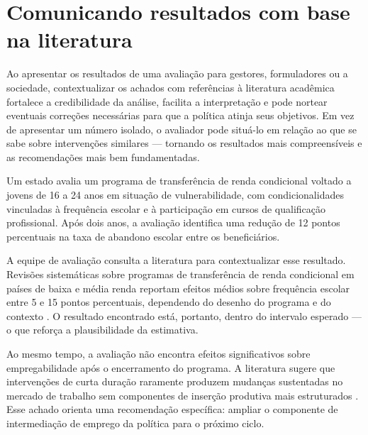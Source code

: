 \documentclass[12pt, a4paper, openany]{book}
\begin{document}
\section{Comunicando resultados com base na literatura}

Ao apresentar os resultados de uma avaliação para gestores, formuladores ou a
sociedade, contextualizar os achados com referências à literatura acadêmica
fortalece a credibilidade da análise, facilita a interpretação e pode nortear
eventuais correções necessárias para que a política atinja seus objetivos.
Em vez de apresentar um número isolado, o avaliador pode situá-lo em relação
ao que se sabe sobre intervenções similares --- tornando os resultados mais
compreensíveis e as recomendações mais bem fundamentadas.

\begin{exemplobox}
Um estado avalia um programa de transferência de renda condicional voltado a
jovens de 16 a 24 anos em situação de vulnerabilidade, com condicionalidades
vinculadas à frequência escolar e à participação em cursos de qualificação
profissional. Após dois anos, a avaliação identifica uma redução de 12 pontos
percentuais na taxa de abandono escolar entre os beneficiários.

A equipe de avaliação consulta a literatura para contextualizar esse
resultado. Revisões sistemáticas sobre programas de transferência de renda
condicional em países de baixa e média renda reportam efeitos médios sobre
frequência escolar entre 5 e 15 pontos percentuais, dependendo do desenho do
programa e do contexto \citep{Baird2014}. O resultado encontrado está,
portanto, dentro do intervalo esperado --- o que reforça a plausibilidade da
estimativa.

Ao mesmo tempo, a avaliação não encontra efeitos significativos sobre
empregabilidade após o encerramento do programa. A literatura sugere que
intervenções de curta duração raramente produzem mudanças sustentadas no
mercado de trabalho sem componentes de inserção produtiva mais estruturados
\citep{Kluve2016}. Esse achado orienta uma recomendação específica: ampliar
o componente de intermediação de emprego da política para o próximo ciclo.
\end{exemplobox}
\end{document}
